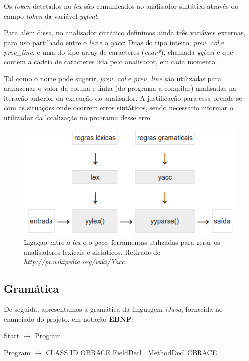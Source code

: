 \documentclass[11pt,a4paper]{article}
\begin{document}
Os \emph{token} detetados no \emph{lex} são comunicados ao analisador sintático através do campo \emph{token} da variável \emph{yylval}.

Para além disso, no analisador sintático definimos ainda três variáveis externas, para uso partilhado entre o \emph{lex} e o \emph{yacc}: Duas do tipo inteiro, \emph{prev\_col} e \emph{prev\_line}, e uma do tipo array de caracteres (\emph{char*}), chamada \emph{yytext} e que contém a cadeia de caracteres lida pelo analisador, em cada momento.

Tal como o nome pode sugerir, \emph{prev\_col} e \emph{prev\_line} são utilizadas para armazenar o valor da coluna e linha (do programa a compilar) analisadas na iteração anterior da execução do analisador. A justificação para essa prende-se com as situações onde ocorrem erros sintáticos, sendo necessário informar o utilizador da localização no programa desse erro.

\begin{figure}[H]
  \centering
      \includegraphics[scale=0.5]{DiagramaLExYACC.png}
  \caption{Ligação entre o \emph{lex} e o \emph{yacc}, ferramentas utilizadas para gerar os analisadores lexicais e sintáticos. Retirado de \emph{http://pt.wikipedia.org/wiki/Yacc}}
\end{figure}

\subsection{Gramática}

De seguida, apresentamos a gramática da linguagem \emph{iJava}, fornecida no enunciado do projeto, em notação \textbf{EBNF}:

\vspace{0.5cm}

\hspace{-1cm}Start $\rightarrow$ Program

\hspace{-1cm}Program $\rightarrow$ CLASS ID OBRACE { FieldDecl $\mid$ MethodDecl } CBRACE
\end{document}
